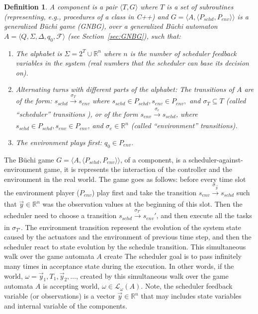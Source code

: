 \documentclass[ twoside, 12pt ]{article}
\newcommand\R{{\mathbb R}}
\newtheorem{dfn}{Definition} %
\newcommand{\buchi}{B\"uchi }
\begin{document}
\begin{dfn}
    A component is a pair $\langle T,G\rangle$ where $T$ is a set of subroutines (representing, e.g., procedures of a class in C++) and $G=\langle A,\langle P_{schd}, P_{env}\rangle \rangle$ is a generalized B{\"u}chi game (GNBG), over a generalized \buchi automaton $A= \langle Q,\Sigma,\Delta,q_0,\mathcal{F} \rangle $ (see Section~\ref{sec:GNBG}), such that:
    \begin{enumerate}
        \item The \textit{alphabet} is $\Sigma = 2^{T} \cup \R^n$ where $n$ is the number of scheduler feedback variables in the system (real numbers that the scheduler can base its decision on).
        \item 
        Alternating turns with different parts of the alphabet:
       	The transitions of $A$ are of the form: $s_{schd} \xrightarrow[]{\sigma_{T}} s_{env}$ where $s_{schd} \in P_{schd}, s_{env} \in P_{env},$ and $\sigma_{T} \subseteq T$ (called  ``scheduler'' transitions ),  or of the form $s_{env} \xrightarrow[]{\sigma_{e}} s_{schd}$, where $s_{schd} \in P_{schd}, s_{env} \in P_{env}$, and $\sigma_{e} \in \R^n$ (called ``environment'' transitions).
        \item The environment plays first: $q_0 \in P_{env}$.
    \end{enumerate}
\end{dfn}

The \buchi game $G=\langle A,\langle P_{schd}, P_{env}\rangle \rangle$, of a component, is a scheduler-against-environment game, it is represents the interaction of the controller and the environment in the real world.
The game goes as follows: before every time slot the environment player ($P_{env}$) play first and take the transition $s_{env} \xrightarrow[]{\sigma_{\vec{y}}} s_{schd}$ such that $\vec{y} \in \R^n$ was the observation values at the beginning of this slot.
Then the scheduler need to choose a transition $s_{schd} \xrightarrow[]{\sigma_{T'}} s_{env}'$, and then execute all the tasks in $\sigma_{T'}$.
The environment transition represent the evolution of the system state caused by the actuators and the environment of previous time step, and then the scheduler react to state evolution by the schedule transition.
This simultaneous walk over the game automata $A$ create
The scheduler goal is to pass infinitely many times in acceptance state during the execution.
In other words, if the world, $\omega = \vec{y}_1 , T_1, \vec{y}_2, \dots $, created by this simultaneous walk over the game automata $A$ is accepting world, $\omega \in \mathcal{L}_{\omega}(A)$.
Note, the scheduler feedback variable (or observations) is a vector $\vec{y} \in \R^n$ that may includes state variables and internal variable of the components.
\end{document}
